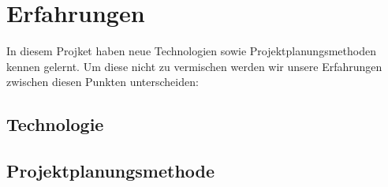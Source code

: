 \section{Erfahrungen}

In diesem Projket haben neue Technologien sowie Projektplanungsmethoden kennen gelernt. Um diese nicht zu vermischen werden wir unsere Erfahrungen zwischen diesen Punkten unterscheiden: 
\subsection{Technologie}
\subsection{Projektplanungsmethode}
